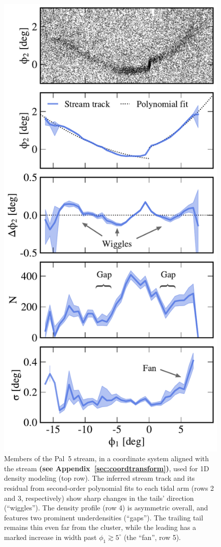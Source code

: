 \documentclass[twocolumn]{aastex62}
\newcommand{\changes}[1]{{\textbf{#1}}}
\begin{document}
\begin{figure}
\begin{center}
\includegraphics[width=0.8\columnwidth]{observed_profiles.pdf}
\end{center}
\caption{
Members of the Pal~5 stream, in a coordinate system aligned with the stream
\changes{(see Appendix~\ref{sec:coordtransform})}, used for 1D density modeling
(top row).
The inferred stream track and its residual from second-order polynomial fits to each tidal arm (rows 2 and 3, respectively) show sharp changes in the tails' direction (``wiggles'').
The density profile (row 4) is asymmetric overall, and features two prominent underdensities (``gaps'').
The trailing tail remains thin even far from the cluster, while the leading has a marked increase in width past $\phi_1\gtrsim5^\circ$ (the ``fan'', row 5).
}
\label{fig:profiles}
\end{figure}
\end{document}
